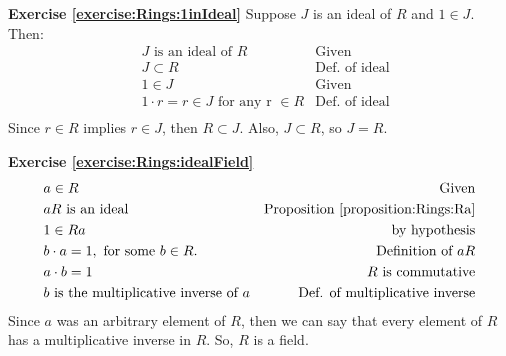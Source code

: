 
\noindent\textbf{Exercise \ref{exercise:Rings:1inIdeal}}
Suppose $J$ is an ideal of $R$ and $1\in J$.  Then:
\begin{align*}
&J \text { is an ideal of } R & \text{Given}\\
&J\subset R & \text{Def. of ideal}\\
&1\in J & \text{Given}\\
&1\cdot r=r\in J \text{ for any r }\in R & \text{Def. of ideal}\\
\end{align*}
Since $r\in R$ implies $r\in J$, then $R\subset J$.  Also, $J\subset R$, so $J=R$.

\noindent\textbf{Exercise \ref{exercise:Rings:idealField}}
\begin{align*}
&a\in R & \text{Given}\\
&aR \text{ is an ideal} & \text{Proposition }\ref{proposition:Rings:Ra}\\
&1\in Ra & \text{by hypothesis}\\
&b\cdot a=1, \text{ for some } b\in R. & \text{Definition of $aR$}\\
&\text{$a\cdot b=1$} & \text{$R$ is commutative}\\
&\text{$b$ is the multiplicative inverse of $a$} & \text{Def. of multiplicative inverse}\\
\end{align*}
Since $a$ was an arbitrary element of $R$, then we can say that every element of $R$ has a multiplicative inverse in $R$.  So, $R$ is a field.























